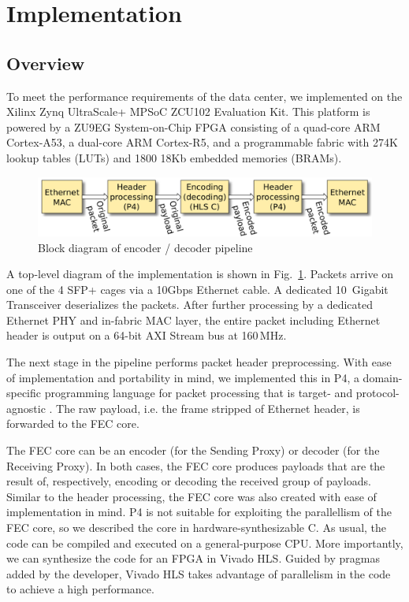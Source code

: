 \section{Implementation}
\label{sec:implementation}

\subsection{Overview}

To meet the performance requirements of the data center, we implemented \OurSys
on the Xilinx Zynq UltraScale+ MPSoC ZCU102 Evaluation Kit.  This platform is
powered by a ZU9EG System-on-Chip FPGA consisting of a quad-core ARM Cortex-A53, a
dual-core ARM Cortex-R5, and a programmable fabric with 274K lookup tables
(LUTs) and 1800 18Kb embedded memories (BRAMs).

\begin{figure}
  \centering
  \includegraphics[width=0.4\paperwidth]{Top_level.pdf}
  \caption{\label{fig:toplevel} Block diagram of encoder / decoder pipeline}
\end{figure}

A top-level diagram of the implementation is shown in Fig.~\ref{fig:toplevel}.
Packets arrive on one of the 4 SFP+ cages via a 10Gbps Ethernet cable.
A dedicated 10~Gigabit Transceiver deserializes the packets.  After further
processing by a dedicated Ethernet PHY and in-fabric MAC layer, the entire
packet including Ethernet header is output on a 64-bit AXI Stream bus at 160\,MHz.

The next stage in the pipeline performs packet header preprocessing.  With
ease of implementation and portability in mind, we implemented this in P4, a
domain-specific programming language for packet processing that is target- and
protocol-agnostic \cite{p4_sigcomm_review2014}.  The raw payload, i.e. the frame stripped of Ethernet
header, is forwarded to the FEC core.  

The FEC core can be an encoder (for the Sending Proxy) or decoder (for the
Receiving Proxy).  In both cases, the FEC core
produces payloads that are the result of, respectively, encoding or decoding
the received group of payloads.  Similar to the header processing, the FEC core
was also created with ease of implementation in mind.  P4 is not suitable
for
exploiting the parallellism of the FEC core, so we described the core in
hardware-synthesizable C.  As usual, the code can be compiled and executed on a
general-purpose CPU.  More importantly, we can synthesize the code for an FPGA
in Vivado HLS.  Guided by pragmas added by the developer, Vivado HLS takes
advantage of parallelism in the code to achieve a high performance.

